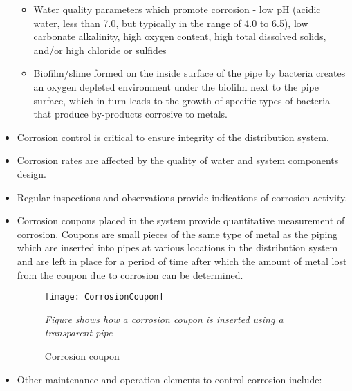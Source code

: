 \begin{itemize}
\begin{itemize}
\item Water quality parameters which promote corrosion - low pH (acidic water, less than 7.0, but typically in the range of 4.0 to 6.5), low carbonate alkalinity, high oxygen content, high total dissolved solids, and/or high chloride or sulfides
\item Biofilm/slime formed on the inside surface of the pipe by bacteria creates an oxygen depleted environment under the biofilm next to the pipe surface, which in turn leads to the growth of specific types of bacteria that produce by-products corrosive to metals.
\end{itemize}

\item Corrosion control is critical to ensure integrity of the distribution system.
\item Corrosion rates are affected by the quality of water and system components design.
\item Regular inspections and observations provide indications of corrosion activity.
\item Corrosion coupons  placed in the system provide quantitative measurement of corrosion.  Coupons are small pieces of the same type of metal as the piping which are inserted into pipes at various locations in the distribution system and are left in place for a period of time after which the amount of metal lost from the coupon due to corrosion can be determined.
\setlength{\floatsep}{-0.5ex plus0.2ex}
\begin{figure}[H]
			      	\begin{center}
			      		\texttt{[image: CorrosionCoupon]}\\
			      		\caption{Corrosion coupon}
			      		\textit{Figure shows how a corrosion coupon is inserted using a transparent pipe}
			      	\end{center}
\end{figure} 
\item Other maintenance and operation elements to control corrosion include:


\end{itemize}
